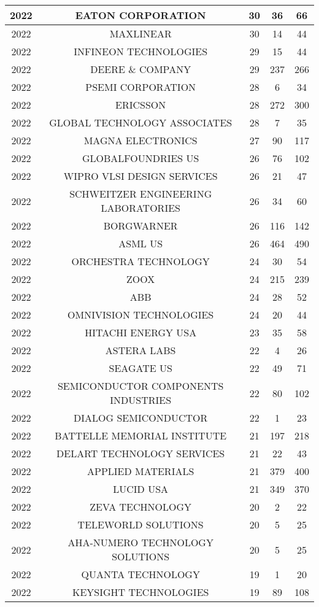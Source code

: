 \documentclass{article}%
\begin{document}
\begin{longtable}{c|c|c|c|c}
\hline%
2022&EATON CORPORATION&30&36&66\\%
\hline%
2022&MAXLINEAR&30&14&44\\%
\hline%
2022&INFINEON TECHNOLOGIES&29&15&44\\%
\hline%
2022&DEERE \& COMPANY&29&237&266\\%
\hline%
2022&PSEMI CORPORATION&28&6&34\\%
\hline%
2022&ERICSSON&28&272&300\\%
\hline%
2022&GLOBAL TECHNOLOGY ASSOCIATES&28&7&35\\%
\hline%
2022&MAGNA ELECTRONICS&27&90&117\\%
\hline%
2022&GLOBALFOUNDRIES US&26&76&102\\%
\hline%
2022&WIPRO VLSI DESIGN SERVICES&26&21&47\\%
\hline%
2022&SCHWEITZER ENGINEERING LABORATORIES&26&34&60\\%
\hline%
2022&BORGWARNER&26&116&142\\%
\hline%
2022&ASML US&26&464&490\\%
\hline%
2022&ORCHESTRA TECHNOLOGY&24&30&54\\%
\hline%
2022&ZOOX&24&215&239\\%
\hline%
2022&ABB&24&28&52\\%
\hline%
2022&OMNIVISION TECHNOLOGIES&24&20&44\\%
\hline%
2022&HITACHI ENERGY USA&23&35&58\\%
\hline%
2022&ASTERA LABS&22&4&26\\%
\hline%
2022&SEAGATE US&22&49&71\\%
\hline%
2022&SEMICONDUCTOR COMPONENTS INDUSTRIES&22&80&102\\%
\hline%
2022&DIALOG SEMICONDUCTOR&22&1&23\\%
\hline%
2022&BATTELLE MEMORIAL INSTITUTE&21&197&218\\%
\hline%
2022&DELART TECHNOLOGY SERVICES&21&22&43\\%
\hline%
2022&APPLIED MATERIALS&21&379&400\\%
\hline%
2022&LUCID USA&21&349&370\\%
\hline%
2022&ZEVA TECHNOLOGY&20&2&22\\%
\hline%
2022&TELEWORLD SOLUTIONS&20&5&25\\%
\hline%
2022&AHA{-}NUMERO TECHNOLOGY SOLUTIONS&20&5&25\\%
\hline%
2022&QUANTA TECHNOLOGY&19&1&20\\%
\hline%
2022&KEYSIGHT TECHNOLOGIES&19&89&108\\%

\end{longtable}
\end{document}
